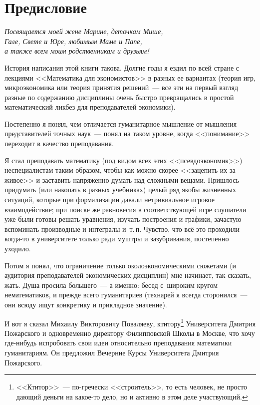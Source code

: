 {\small %

\section{Предисловие}

\begin{flushright}
\it
Посвящается моей жене Марине, деточкам Мише, \\
Гале, Свете и Юре, любимым Маме и Папе, \\
а также всем моим родственникам и друзьям!
\end{flushright}

История написания этой книги такова. Долгие годы я ездил по всей стране с лекциями
<<Математика для экономистов>> в разных ее вариантах (теория игр, микроэкономика или
теория принятия решений~--- все эти на первый взгляд разные по содержанию дисциплины
очень быстро превращались в простой математический ликбез для преподавателей экономики).

Постепенно я понял, чем отличается гуманитарное мышление от мышления представителей
точных наук~--- понял на таком уровне, когда <<понимание>> переходит в качество преподавания.

Я стал преподавать математику (под видом всех этих <<псевдоэкономик>>) неспециалистам
таким образом, чтобы как можно скорее <<зацепить их за живое>> и заставить напряженно
думать над сложными вещами. Пришлось придумать (или накопать в разных учебниках)
целый ряд якобы жизненных ситуаций, которые при формализации давали нетривиальное
игровое взаимодействие; при поиске же равновесия в соответствующей игре слушатели
уже были готовы решать уравнения, изучать построения и графики, зачастую вспоминать
производные и интегралы и~т.\,п. Чувство, что всё это проходили когда-то в университете
только ради муштры и зазубривания, постепенно уходило.

Потом я понял, что ограничение только околоэкономическими сюжетами (и аудитория
преподавателей экономических дис\-цип\-лин) мне начинает, так сказать, жать. Душа просила
большего~--- а именно: бесед с~широким кругом нематематиков, и прежде всего гуманитариев
(технарей я всегда сторонился~--- они всюду ищут конкретику и прикладное значение).

И вот я сказал Михаилу Викторовичу Поваляеву, ктитору\footnote{<<Ктитор>>~--- по-гречески
<<строитель>>, то есть человек, не просто дающий деньги на какое-то дело, но и активно в
этом деле участвующий.} Университета Дмитрия Пожарского и одновременно директору
Филипповской Школы в Москве, что хочу где-нибудь испробовать свои идеи относительно
преподавания математики гуманитариям. Он предложил Вечерние Курсы Университета
Дмитрия По\-жар\-ского.

}
